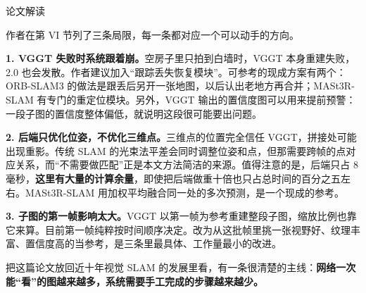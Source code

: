 \begin{interp}{论文解读}

作者在第 VI 节列了三条局限，每一条都对应一个可以动手的方向。

\textbf{1. VGGT 失败时系统跟着崩。}空房子里只拍到白墙时，VGGT 本身重建失败，2.0 也会发散。作者建议加入“跟踪丢失恢复模块”。可参考的现成方案有两个：ORB-SLAM3 的做法是跟丢后另开一张地图，以后认出老地方再合并；MASt3R-SLAM 有专门的重定位模块。另外，VGGT 输出的置信度图可以用来提前预警：一段子图的置信度整体偏低，就说明这段很可能要出问题。

\textbf{2. 后端只优化位姿，不优化三维点。}三维点的位置完全信任 VGGT，拼接处可能出现重影。传统 SLAM 的光束法平差会同时调整位姿和点，但那需要跨帧的点对应关系，而“不需要做匹配”正是本文方法简洁的来源。值得注意的是，后端只占 8 毫秒，\textbf{这里有大量的计算余量}，即使把后端做重十倍也只占总时间的百分之五左右。MASt3R-SLAM 用加权平均融合同一处的多次预测，是一个现成的参考。

\textbf{3. 子图的第一帧影响太大。}VGGT 以第一帧为参考重建整段子图，缩放比例也靠它来算。目前第一帧纯粹按时间顺序决定。改为从这批帧里挑一张视野好、纹理丰富、置信度高的当参考，是三条里最具体、工作量最小的改进。



把这篇论文放回近十年视觉 SLAM 的发展里看，有一条很清楚的主线：\textbf{网络一次能“看”的图越来越多，系统需要手工完成的步骤越来越少。}


\end{interp}
